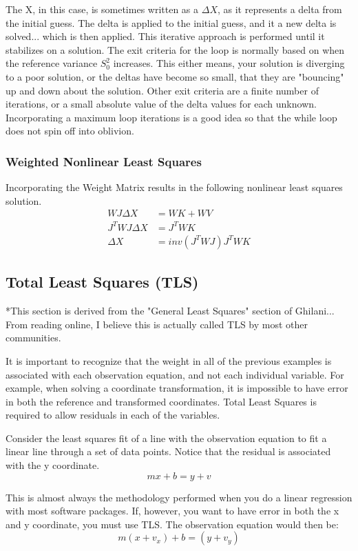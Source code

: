 The X, in this case, is sometimes written as a $\Delta X$, as it represents a delta from the initial guess.  The delta is applied to the initial guess, and it a new delta is solved... which is then applied.  This iterative approach is performed until it stabilizes on a solution.  The exit criteria for the loop is normally based on when the reference variance $S_0^2$ increases.  This either means, your solution is diverging to a poor solution, or the deltas have become so small, that they are "bouncing" up and down about the solution.  Other exit criteria are a finite number of iterations, or a small absolute value of the delta values for each unknown.  Incorporating a maximum loop iterations is a good idea so that the while loop does not spin off into oblivion.  

\subsubsection*{Weighted Nonlinear Least Squares}
Incorporating the Weight Matrix results in the following nonlinear least squares solution.
\begin{align*}
WJ\Delta X&=WK+WV \\
J^TWJ\Delta X &= J^TWK \\
\Delta X &= inv(J^TWJ)J^TWK
\end{align*}
\subsection{Total Least Squares (TLS)}
*This section is derived from the "General Least Squares" section of Ghilani... From reading online, I believe this is actually called TLS by most other communities.  

It is important to recognize that the weight in all of the previous examples is associated with each observation equation, and not each individual variable.  For example, when solving a coordinate transformation, it is impossible to have error in both the reference and transformed coordinates. Total Least Squares is required to allow residuals in each of the variables.

Consider the least squares fit of a line with the observation equation to fit a linear line through a set of data points.  Notice that the residual is associated with the y coordinate.
\[
mx+b = y + v
\]

This is almost always the methodology performed when you do a linear regression with most software packages.  If, however, you want to have error in both the x and y coordinate, you must use TLS.  The observation equation would then be: 
\[
m(x+v_x) + b = (y + v_y)
\]

